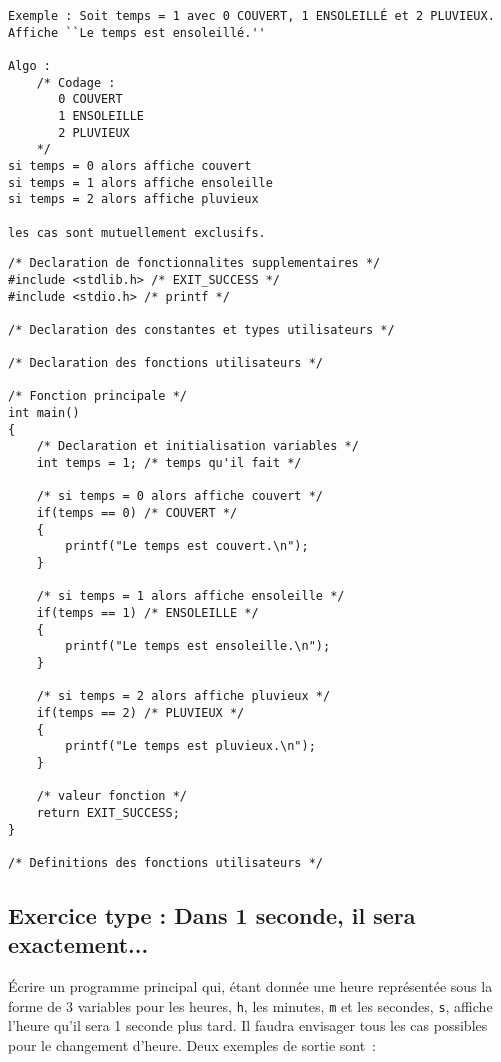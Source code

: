 \begin{correction}
\begin{verbatim}
Exemple : Soit temps = 1 avec 0 COUVERT, 1 ENSOLEILLÉ et 2 PLUVIEUX.
Affiche ``Le temps est ensoleillé.''

Algo :
    /* Codage :
       0 COUVERT
       1 ENSOLEILLE
       2 PLUVIEUX
    */
si temps = 0 alors affiche couvert
si temps = 1 alors affiche ensoleille
si temps = 2 alors affiche pluvieux 

les cas sont mutuellement exclusifs.
\end{verbatim}
\begin{verbatim}
/* Declaration de fonctionnalites supplementaires */
#include <stdlib.h> /* EXIT_SUCCESS */
#include <stdio.h> /* printf */

/* Declaration des constantes et types utilisateurs */

/* Declaration des fonctions utilisateurs */

/* Fonction principale */
int main()
{
    /* Declaration et initialisation variables */
    int temps = 1; /* temps qu'il fait */

    /* si temps = 0 alors affiche couvert */ 
    if(temps == 0) /* COUVERT */
    {
        printf("Le temps est couvert.\n");
    }

    /* si temps = 1 alors affiche ensoleille */ 
    if(temps == 1) /* ENSOLEILLE */
    {
        printf("Le temps est ensoleille.\n");
    }

    /* si temps = 2 alors affiche pluvieux */ 
    if(temps == 2) /* PLUVIEUX */
    {
        printf("Le temps est pluvieux.\n");
    }
    
    /* valeur fonction */
    return EXIT_SUCCESS;
}

/* Definitions des fonctions utilisateurs */
\end{verbatim}
\end{correction}

\subsection{Exercice type : Dans 1 seconde, il sera exactement...}

Écrire un programme principal qui, étant donnée une heure représentée
sous la forme de 3 variables pour les heures, \verb|h|, les minutes,
\verb|m| et les secondes, \verb|s|, affiche l'heure qu'il sera 1
seconde plus tard. Il faudra envisager tous les
cas possibles pour le changement d'heure. Deux exemples de sortie sont~:

